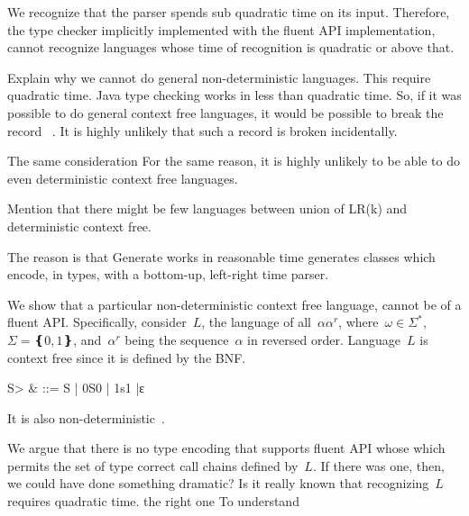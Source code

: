 We recognize that the \Java parser spends sub quadratic time
  on its input.
Therefore,
  the type checker implicitly implemented with the fluent API implementation,
  cannot recognize languages whose time of recognition is quadratic or above that.

Explain why we cannot do general non-deterministic languages. This require quadratic time.
Java type checking works in less than quadratic time. So, if it was possible to
do general context free languages, it would be possible to break the record
~\cite{cubic time algorithms}.
It is highly unlikely that such a record is broken incidentally.

The same consideration
For the same reason, it is highly unlikely to be able to do even deterministic context free languages.
~\cite{http://www.sciencedirect.com/science/article/pii/S0019995868910875}

   Mention that there might be few languages between union of LR(k) and deterministic context free.

The reason is that Generate works in reasonable time \Self generates classes which encode, in types, with a bottom-up, left-right time parser.

We show that a particular non-deterministic context free language,
cannot be of a fluent API.
Specifically, consider~$L$, the language of all~$αα^r$, where~$\omega∈Σ^*$,~$Σ=❴0,1❵$,
and~$α^r$ being the sequence~$α$ in reversed order.
Language~$L$ is context free since it is defined by the BNF.
\begin{Grammar}
  \begin{aligned}
    \<S> & ::= S | 0S0 | 1s1 |ε
  \end{aligned}
\end{Grammar}
It is also non-deterministic~\cite{Hopcroft:2001}.

We argue that there is no type encoding that supports fluent API whose
  which permits the set of type correct call chains defined by~$L$.
If there was one, then, we could have done something dramatic?
Is it really known that recognizing~$L$ requires quadratic
  time.
 the right one 
To understand
